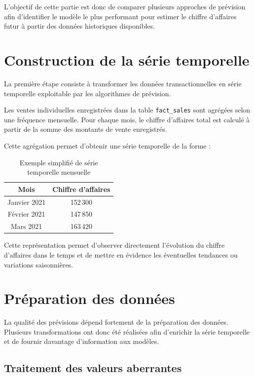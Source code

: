 \documentclass[12pt,a4paper,twoside]{report}
\begin{document}
L'objectif de cette partie est donc de comparer plusieurs approches de prévision afin d'identifier le modèle le plus performant pour estimer le chiffre d'affaires futur à partir des données historiques disponibles.

\section{Construction de la série temporelle}

La première étape consiste à transformer les données transactionnelles en série temporelle exploitable par les algorithmes de prévision.

Les ventes individuelles enregistrées dans la table \texttt{fact\_sales} sont agrégées selon une fréquence mensuelle. Pour chaque mois, le chiffre d'affaires total est calculé à partir de la somme des montants de vente enregistrés.

Cette agrégation permet d'obtenir une série temporelle de la forme :

\begin{table}[H]
\centering
{}
\begin{tabular}{cc}
\toprule
\rowcolor{TableHeader}
\color{white}Mois & \color{white}Chiffre d'affaires \\
\midrule
Janvier 2021 & 152\,300 \\
Février 2021 & 147\,850 \\
Mars 2021 & 163\,420 \\
\bottomrule
\end{tabular}
\caption{Exemple simplifié de série temporelle mensuelle}
\end{table}

Cette représentation permet d'observer directement l'évolution du chiffre d'affaires dans le temps et de mettre en évidence les éventuelles tendances ou variations saisonnières.

\section{Préparation des données}

La qualité des prévisions dépend fortement de la préparation des données. Plusieurs transformations ont donc été réalisées afin d'enrichir la série temporelle et de fournir davantage d'information aux modèles.

\subsection{Traitement des valeurs aberrantes}
\end{document}
